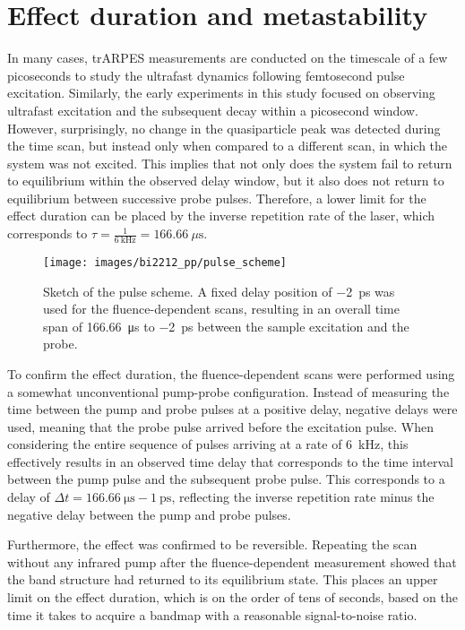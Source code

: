 \section{Effect duration and metastability}
\label{sec:meta}

In many cases, trARPES measurements are conducted on the timescale of a few picoseconds to study the ultrafast dynamics following femtosecond pulse excitation.
Similarly, the early experiments in this study focused on observing ultrafast excitation and the subsequent decay within a picosecond window.
However, surprisingly, no change in the quasiparticle peak was detected during the time scan, but instead only when compared to a different scan, in which the system was not excited.
This implies that not only does the system fail to return to equilibrium within the observed delay window, but it also does not return to equilibrium between successive probe pulses.
Therefore, a lower limit for the effect duration can be placed by the inverse repetition rate of the laser, which corresponds to $\tau=\frac{1}{\qty{6}{\kilo\hertz}}=\qty{166.66}{\mu\second}$.

\begin{figure}[bh!]
	\centering
	\texttt{[image: images/bi2212\_pp/pulse\_scheme]}
	\caption{Sketch of the pulse scheme. A fixed delay position of \qty{-2}{\pico\second} was used for the fluence-dependent scans, resulting in an overall time span of \qty{166.66}{\micro\second} to \qty{-2}{\pico\second} between the sample excitation and the probe.}
	\label{fig:pulsescheme}
\end{figure}

To confirm the effect duration, the fluence-dependent scans were performed using a somewhat unconventional pump-probe configuration.
Instead of measuring the time between the pump and probe pulses at a positive delay, negative delays were used, meaning that the probe pulse arrived before the excitation pulse.
When considering the entire sequence of pulses arriving at a rate of \qty{6}{\kilo\hertz}, this effectively results in an observed time delay that corresponds to the time interval between the pump pulse and the subsequent probe pulse.
This corresponds to a delay of $\Delta t = \qty{166.66}{\micro\second} - \qty{1}{\pico\second}$, reflecting the inverse repetition rate minus the negative delay between the pump and probe pulses.

Furthermore, the effect was confirmed to be reversible.
Repeating the scan without any infrared pump after the fluence-dependent measurement showed that the band structure had returned to its equilibrium state.
This places an upper limit on the effect duration, which is on the order of tens of seconds, based on the time it takes to acquire a bandmap with a reasonable signal-to-noise ratio.


